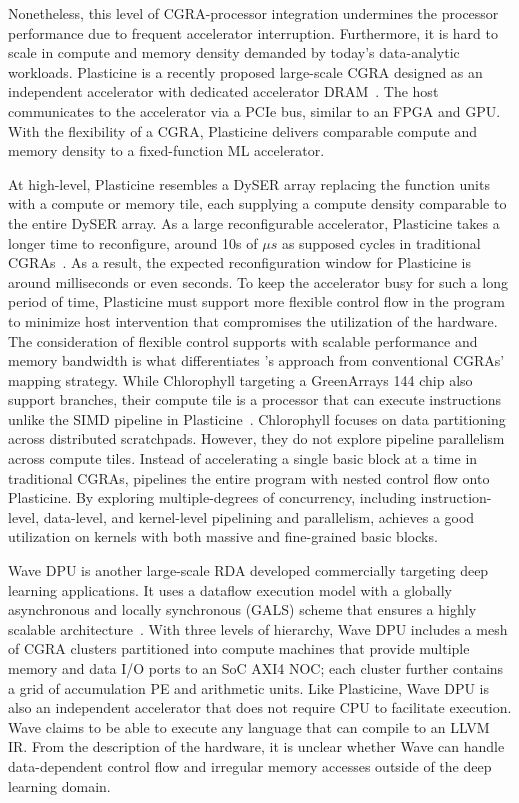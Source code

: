 Nonetheless, this level of CGRA-processor integration undermines the processor performance due to frequent accelerator
interruption. 
Furthermore, it is hard to scale in compute and memory density demanded by today's data-analytic
workloads.
Plasticine is a recently proposed large-scale CGRA 
designed as an independent accelerator with dedicated accelerator DRAM~\cite{plasticine}.
The host communicates to the accelerator via a PCIe bus, similar to an FPGA and GPU.
With the flexibility of a CGRA, Plasticine delivers comparable compute and memory density to
a fixed-function ML accelerator.

At high-level, Plasticine resembles a DySER array replacing the function units with a compute or
memory tile, each supplying a compute density comparable to the entire DySER array.
As a large reconfigurable accelerator, Plasticine takes a longer time to reconfigure, around 10s
of $\mu s$ as supposed cycles in traditional CGRAs~\cite{dyser}.
As a result, the expected reconfiguration window for Plasticine is around milliseconds or even
seconds.
To keep the accelerator busy for such a long period of time, Plasticine must support more flexible
control flow in the program to minimize host intervention that compromises the utilization of the hardware.
The consideration of flexible control supports with scalable performance and memory
bandwidth is what differentiates \name's approach from conventional CGRAs' mapping strategy.
While Chlorophyll targeting a GreenArrays 144 chip also support branches, their compute tile is a processor that can execute instructions unlike the SIMD pipeline in Plasticine~\cite{synaid}. 
Chlorophyll focuses on data partitioning across distributed scratchpads. However,
they do not explore pipeline parallelism across compute tiles.
Instead of accelerating a single basic block at a time in traditional CGRAs, 
\name pipelines the entire program with nested control flow onto Plasticine.
By exploring multiple-degrees of concurrency, including instruction-level, data-level, and kernel-level
pipelining and parallelism, \name achieves a good utilization on kernels with both massive and fine-grained
basic blocks.

Wave DPU is another large-scale RDA developed commercially targeting deep learning applications.
It uses a dataflow execution model with a globally asynchronous and locally synchronous (GALS) scheme
that ensures a highly scalable architecture~\cite{wavecomputing}.
With three levels of hierarchy, Wave DPU includes a mesh of CGRA clusters partitioned into compute
machines that provide multiple memory and data I/O ports to an SoC AXI4 NOC; each cluster
further contains a grid of accumulation PE and arithmetic units.
Like Plasticine, Wave DPU is also an independent accelerator that does not require CPU to facilitate
execution.
Wave claims to be able to execute any language that can compile to an LLVM IR.
From the description of the hardware, it is unclear whether Wave can handle data-dependent control flow and
irregular memory accesses outside of the deep learning domain.

